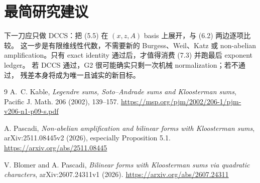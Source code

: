 \documentclass[11pt,a4paper]{ctexart}
\theoremstyle{definition}
\begin{document}
\section{最简研究建议}

下一刀应只做 DCCS：把 (5.5) 在 $(x,z,A)$ basis 上展开，与 (6.2) 两边逐项比较。
这一步是有限维线性代数，不需要新的 Burgess、Weil、Katz 或 non-abelian
amplification。只有 exact identity 通过后，才值得消费 (7.3) 并跑最后 exponent ledger。
若 DCCS 通过，G2 很可能确实只剩一次机械 normalization；若不通过，
残差本身将成为唯一且诚实的新目标。

\begin{thebibliography}{9}
A.~C. Kable,
\emph{Legendre sums, Soto--Andrade sums and Kloosterman sums},
Pacific J. Math. 206 (2002), 139--157.
\url{https://msp.org/pjm/2002/206-1/pjm-v206-n1-p09-s.pdf}

A. Pascadi,
\emph{Non-abelian amplification and bilinear forms with Kloosterman sums},
arXiv:2511.08445v2 (2026), especially Proposition 5.1.
\url{https://arxiv.org/abs/2511.08445}

V. Blomer and A. Pascadi,
\emph{Bilinear forms with Kloosterman sums via quadratic characters},
arXiv:2607.24311v1 (2026).
\url{https://arxiv.org/abs/2607.24311}
\end{thebibliography}
\end{document}
